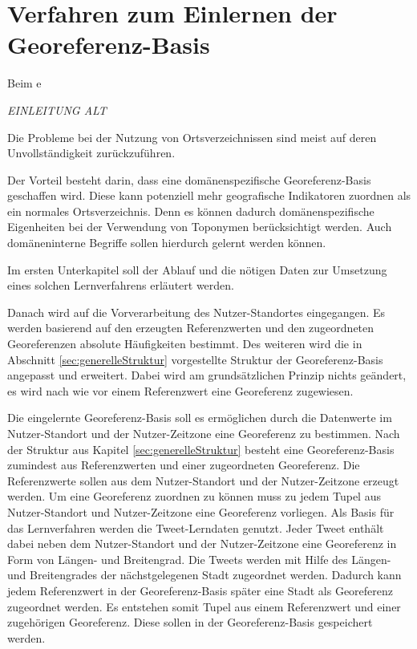 	\section{Verfahren zum Einlernen der Georeferenz-Basis} \label{sec:VefrahrenZumEinlernen} 

		Beim e


		\textit{EINLEITUNG ALT} 

			Die Probleme bei der Nutzung von Ortsverzeichnissen sind meist auf deren Unvollständigkeit zurückzuführen. 

			Der Vorteil besteht darin, dass eine domänenspezifische Georeferenz-Basis geschaffen wird.
			Diese kann potenziell mehr geografische Indikatoren zuordnen als ein normales Ortsverzeichnis.
			Denn es können dadurch domänenspezifische Eigenheiten bei der Verwendung von Toponymen berücksichtigt werden. 
			Auch domäneninterne Begriffe sollen hierdurch gelernt werden können.

			Im ersten Unterkapitel soll der Ablauf und die nötigen Daten zur Umsetzung eines solchen Lernverfahrens erläutert werden.

			Danach wird auf die Vorverarbeitung des Nutzer-Standortes eingegangen.
			Es werden basierend auf den erzeugten Referenzwerten und den zugeordneten Georeferenzen absolute Häufigkeiten bestimmt.
			Des weiteren wird die in Abschnitt \ref{sec:generelleStruktur} vorgestellte Struktur der Georeferenz-Basis angepasst und erweitert.
			Dabei wird am grundsätzlichen Prinzip nichts geändert, es wird nach wie vor einem Referenzwert eine Georeferenz zugewiesen. 

			Die eingelernte Georeferenz-Basis soll es ermöglichen durch die Datenwerte im Nutzer-Standort und der Nutzer-Zeitzone eine Georeferenz zu bestimmen.
			Nach der Struktur aus Kapitel \ref{sec:generelleStruktur} besteht eine Georeferenz-Basis zumindest aus Referenzwerten und einer zugeordneten Georeferenz.
			Die Referenzwerte sollen aus dem Nutzer-Standort und der Nutzer-Zeitzone erzeugt werden.
			Um eine Georeferenz zuordnen zu können muss zu jedem Tupel aus Nutzer-Standort und Nutzer-Zeitzone eine Georeferenz vorliegen.
			Als Basis für das Lernverfahren werden die Tweet-Lerndaten genutzt.
			Jeder Tweet enthält dabei neben dem Nutzer-Standort und der Nutzer-Zeitzone eine Georeferenz in Form von Längen- und Breitengrad. 
			Die Tweets werden mit Hilfe des Längen- und Breitengrades der nächstgelegenen Stadt zugeordnet werden. 
			Dadurch kann jedem Referenzwert in der Georeferenz-Basis später eine Stadt als Georeferenz zugeordnet werden.
			Es entstehen somit Tupel aus einem Referenzwert und einer zugehörigen Georeferenz.
			Diese sollen in der Georeferenz-Basis gespeichert werden.

